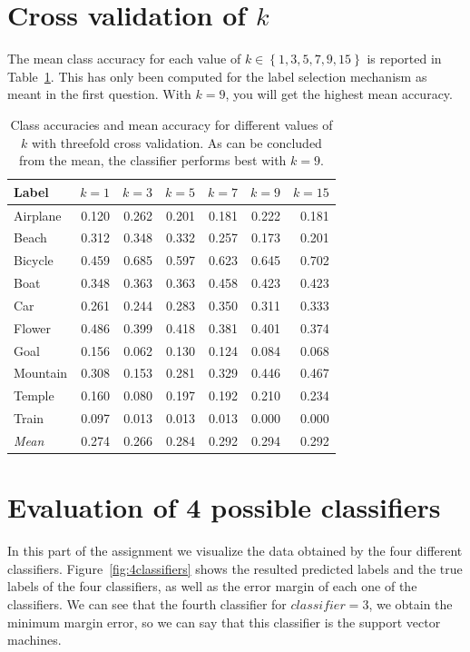 \documentclass[a4paper,10pt]{article}
\begin{document}
\section{Cross validation of $k$}
The mean class accuracy for each value of $k \in \left\{1, 3, 5, 7, 9, 15\right\}$ is reported in Table~\ref{t:crossacc}.  This has only been computed for the label selection mechanism as meant in the first question.  With $k=9$, you will get the highest mean accuracy.

\begin{table}
  \centering
  \begin{tabular}{l|rrrrrr}
    Label &  $k=1$ &  $k=3$ &  $k=5$ &  $k=7$ &  $k=9$ &  $k=15$ \\
    \hline
    Airplane  & 0.120  & 0.262  & 0.201  & 0.181  & 0.222  & 0.181 \\
       Beach  & 0.312  & 0.348  & 0.332  & 0.257  & 0.173  & 0.201 \\
     Bicycle  & 0.459  & 0.685  & 0.597  & 0.623  & 0.645  & 0.702 \\
        Boat  & 0.348  & 0.363  & 0.363  & 0.458  & 0.423  & 0.423 \\
         Car  & 0.261  & 0.244  & 0.283  & 0.350  & 0.311  & 0.333 \\
      Flower  & 0.486  & 0.399  & 0.418  & 0.381  & 0.401  & 0.374 \\
        Goal  & 0.156  & 0.062  & 0.130  & 0.124  & 0.084  & 0.068 \\
    Mountain  & 0.308  & 0.153  & 0.281  & 0.329  & 0.446  & 0.467 \\
      Temple  & 0.160  & 0.080  & 0.197  & 0.192  & 0.210  & 0.234 \\
       Train  & 0.097  & 0.013  & 0.013  & 0.013  & 0.000  & 0.000 \\
    \hline
  \emph{Mean} & 0.274  & 0.266  & 0.284  & 0.292  & 0.294  & 0.292 \\
  \end{tabular}
  \caption{Class accuracies and mean accuracy for different values of $k$ with threefold cross validation.  As can be concluded from the mean, the classifier performs best with $k=9$.}
  \label{t:crossacc}
\end{table}

\section{Evaluation of 4 possible classifiers}
In this part of the assignment we visualize the data obtained by the four different classifiers. Figure~\ref{fig:4classifiers} shows the resulted predicted labels and the true labels of the four classifiers, as well as the error margin of each one of the classifiers. We can see that the fourth classifier for $classifier = 3$, we obtain the minimum margin error, so we can say that this classifier is the support vector machines.
\end{document}
